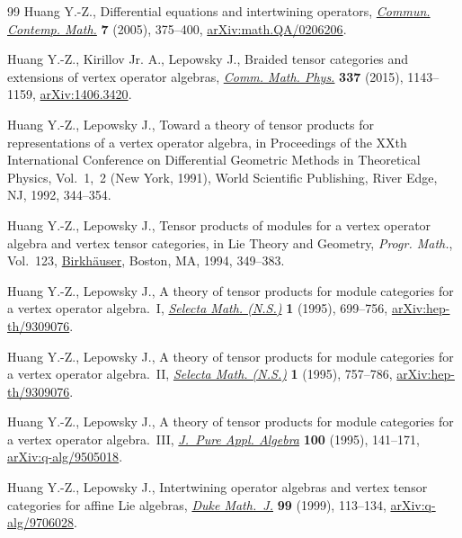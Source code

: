 \begin{thebibliography}{99}
Huang Y.-Z., Differential equations and intertwining operators,
 \href{https://doi.org/10.1142/S0219199705001799}{\textit{Commun. Contemp.
 Math.}} \textbf{7} (2005), 375--400,
 \href{http://arxiv.org/abs/math.QA/0206206}{arXiv:math.QA/0206206}.

Huang Y.-Z., Kirillov Jr. A., Lepowsky J., Braided tensor categories and
 extensions of vertex operator algebras,
 \href{https://doi.org/10.1007/s00220-015-2292-1}{\textit{Comm. Math. Phys.}}
 \textbf{337} (2015), 1143--1159,
 \href{http://arxiv.org/abs/1406.3420}{arXiv:1406.3420}.

Huang Y.-Z., Lepowsky J., Toward a theory of tensor products for representations
 of a vertex operator algebra, in Proceedings of the {XX}th {I}nternational
 {C}onference on {D}ifferential {G}eometric {M}ethods in {T}heoretical
 {P}hysics, {V}ol.~1,~2 ({N}ew {Y}ork, 1991), World Scientific Publishing,
 River Edge, NJ, 1992, 344--354.

Huang Y.-Z., Lepowsky J., Tensor products of modules for a vertex operator
 algebra and vertex tensor categories, in Lie {T}heory and {G}eometry,
 \textit{Progr. Math.}, Vol.~123,
 \href{https://doi.org/10.1007/978-1-4612-0261-5_13}{Birkh\"auser}, Boston,
 MA, 1994, 349--383.

Huang Y.-Z., Lepowsky J., A theory of tensor products for module categories for
 a vertex operator algebra.~{I},
 \href{https://doi.org/10.1007/BF01587908}{\textit{Selecta Math. (N.S.)}}
 \textbf{1} (1995), 699--756,
 \href{http://arxiv.org/abs/hep-th/9309076}{arXiv:hep-th/9309076}.

Huang Y.-Z., Lepowsky J., A theory of tensor products for module categories for
 a vertex operator algebra.~{II},
 \href{https://doi.org/10.1007/BF01587908}{\textit{Selecta Math. (N.S.)}}
 \textbf{1} (1995), 757--786,
 \href{http://arxiv.org/abs/hep-th/9309076}{arXiv:hep-th/9309076}.

Huang Y.-Z., Lepowsky J., A theory of tensor products for module categories for
 a vertex operator algebra.~{III},
 \href{https://doi.org/10.1016/0022-4049(95)00049-3}{\textit{J.~Pure Appl.
 Algebra}} \textbf{100} (1995), 141--171,
 \href{http://arxiv.org/abs/q-alg/9505018}{arXiv:q-alg/9505018}.

Huang Y.-Z., Lepowsky J., Intertwining operator algebras and vertex tensor
 categories for affine {L}ie algebras,
 \href{https://doi.org/10.1215/S0012-7094-99-09905-2}{\textit{Duke Math.~J.}}
 \textbf{99} (1999), 113--134,
 \href{http://arxiv.org/abs/q-alg/9706028}{arXiv:q-alg/9706028}.


\end{thebibliography}
